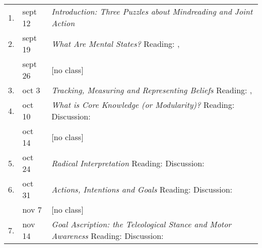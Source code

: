 \documentclass[12pt,\papersize]{extarticle}
\begin{document}
{
	\renewcommand{\arraystretch}{1.5}
\begin{table}[htbp]
\begin{center}
\footnotesize	%
\begin{tabular*}{1\textwidth}{ l l m{} } 

\toprule

1. & sept 12  
	&  \textit{Introduction: Three Puzzles about Mindreading and Joint Action}
\\  2. & sept 19  
	& \textit{What Are Mental States?}
		\newline Reading: \citet[§§1.1--1.3, 3.1--3.4, 4.1]{Jeffrey:1983oe}, \citet[§1]{fitch:2009_singular}
\\ &   sept 26 & [no class]
\\ 3. & oct 3 
		& \textit{Tracking, Measuring and Representing Beliefs}
			\newline  Reading: \citet{matthews:1994_measure}, \citet{kovacs_social_2010}
\\  4. & oct 10 
	&  \textit{What is Core Knowledge (or Modularity)?}
		\newline Reading: \citet{Fodor:1983dg,Fodor:2000cj,Baillargeon:gx,Wellman:2001lz}
		\newline Discussion: {\citet{Sugden:2000mw}}
\\ & oct 14 & [no class]
\\ 5. & oct 24 
	& 	\textit{Radical Interpretation}
		\newline Reading: \citet{Davidson:1985qg,Davidson:1973jx,Davidson:1980xp,Davidson:1990du}
		\newline Discussion: \citet{matthews:1994_measure}
\\ 6. & oct 31 
	& \textit{Actions, Intentions and Goals}
		\newline Reading: \citet{Davidson:1971fz,Davidson:1978hy,Bratman:1985fk,bratman:2000_valuing} 
		\newline Discussion: \citet{Davidson:1973jx}
\\ & nov 7 & [no class]
\\ 7. & nov 14 
	& \textit{Goal Ascription: the Teleological Stance and Motor Awareness}
		\newline Reading: \citet{Millikan:1989cd,Millikan:1993_behaviour,Millikan:1993_green,Gergely:1995sq,Csibra:2003kp,Fogassi:2005nf}
		\newline Discussion: \citet{Bratman:1984jr}

\end{tabular*}
\end{center}
\end{table}}
\end{document}

